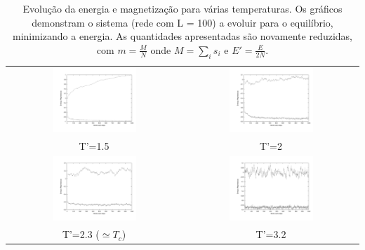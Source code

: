 \documentclass[a4paper,10pt]{article}
\begin{document}
\begin{table}[h!]
\centering
\begin{tabular}{c c}
\includegraphics[angle=0, width=0.5\textwidth]{images/vars15}&\includegraphics[angle=0, width=0.5\textwidth]{images/vars2}\\
\newline
{\footnotesize T'=1.5}&{\footnotesize T'=2}\\
\includegraphics[angle=0, width=0.5\textwidth]{images/vars23}&\includegraphics[angle=0, width=0.5\textwidth]{images/vars32}\\
{\footnotesize T'=2.3 ($\simeq T_c$)}&{\footnotesize T'=3.2}
\end{tabular}
\caption{Evolução da energia e magnetização para várias temperaturas. Os gráficos demonstram o sistema (rede com L = 100) a evoluir para o equilíbrio, minimizando a energia. As quantidades apresentadas são novamente reduzidas, com $m =\frac{M}{N}$ onde $M=\sum_i s_i$ e $E'=\frac{E}{2N}$. }
 \label{tab:1}
\end{table}
\end{document}
